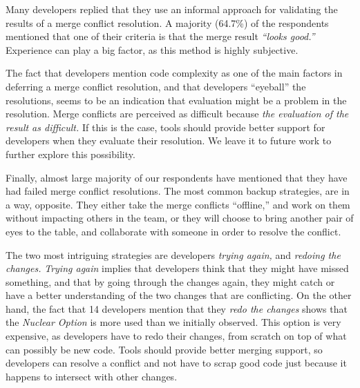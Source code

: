 Many developers replied that they use an informal approach for validating the results of a merge conflict resolution.
A majority (64.7\%) of the respondents mentioned that one of their criteria is that the merge result \emph{``looks good.''}
Experience can play a big factor, as this method is highly subjective.

The fact that developers mention code complexity as one of the main factors in deferring a merge conflict resolution, and that developers ``eyeball'' the resolutions, seems to be an indication that evaluation might be a problem in the resolution.
Merge conflicts are perceived as difficult because \emph{the evaluation of the result as difficult.}
If this is the case, tools should provide better support for developers when they evaluate their resolution.
We leave it to future work to further explore this possibility. 



Finally, almost large majority of our respondents have mentioned that they have had failed merge conflict resolutions.
The most common backup strategies, are in a way, opposite.
They either take the merge conflicts ``offline,'' and work on them without impacting others in the team, or they will choose to bring another pair of eyes to the table, and collaborate with someone in order to resolve the conflict.

The two most intriguing strategies are developers \emph{trying again,} and \emph{redoing the changes.}
\emph{Trying again} implies that developers think that they might have missed something, and that by going through the changes again, they might catch or have a better understanding of the two changes that are conflicting.
On the other hand, the fact that 14 developers mention that they \emph{redo the changes} shows that the \emph{Nuclear Option} is more used than we initially observed.
This option is very expensive, as developers have to redo their changes, from scratch on top of what can possibly be new code.
Tools should provide better merging support, so developers can resolve a conflict and not have to scrap good code just because it happens to intersect with other changes.

